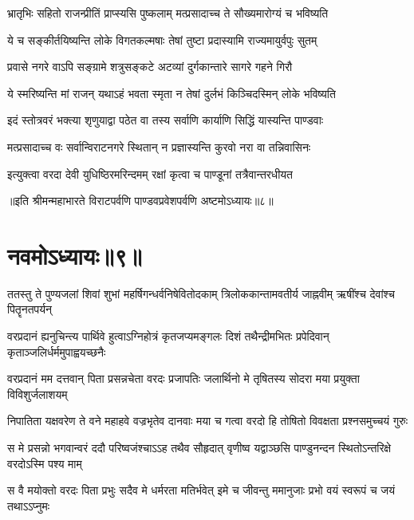 \twolineshloka
{भ्रातृभिः सहितो राजन्प्रीतिं प्राप्स्यसि पुष्कलाम्}
{मत्प्रसादाच्च ते सौख्यमारोग्यं च भविष्यति}


\twolineshloka
{ये च सङ्कीर्तयिष्यन्ति लोके विगतकल्मषाः}
{तेषां तुष्टा प्रदास्यामि राज्यमायुर्वपुः सुतम्}


\twolineshloka
{प्रवासे नगरे वाऽपि सङ्ग्रामे शत्रुसङ्कटे}
{अटव्यां दुर्गकान्तारे सागरे गहने गिरौ}


\twolineshloka
{ये स्मरिष्यन्ति मां राजन् यथाऽहं भवता स्मृता}
{न तेषां दुर्लभं किञ्चिदस्मिन् लोके भविष्यति}


\twolineshloka
{इदं स्तोत्रवरं भक्त्या शृणुयाद्वा पठेत वा}
{तस्य सर्वाणि कार्याणि सिद्धिं यास्यन्ति पाण्डवाः}


\twolineshloka
{मत्प्रसादाच्च वः सर्वान्विराटनगरे स्थितान्}
{न प्रज्ञास्यन्ति कुरवो नरा वा तन्निवासिनः}


\twolineshloka
{इत्युक्त्वा वरदा देवी युधिष्ठिरमरिन्दमम्}
{रक्षां कृत्वा च पाण्डूनां तत्रैवान्तरधीयत}



॥इति श्रीमन्महाभारते विराटपर्वणि पाण्डवप्रवेशपर्वणि अष्टमोऽध्यायः॥८॥

\chapter{नवमोऽध्यायः॥९॥}

\fourlineindentedshloka
{ततस्तु ते पुण्यजलां शिवां शुभां}
{महर्षिगन्धर्वनिषेवितोदकाम्}
{त्रिलोककान्तामवतीर्य जाह्नवीम्}
{ऋषींश्च देवांश्च पितॄनतपर्यन्}


\fourlineindentedshloka
{वरप्रदानं ह्यनुचिन्त्य पार्थिवे}
{हुत्वाऽग्निहोत्रं कृतजप्यमङ्गलः}
{दिशं तथैन्द्रीमभितः प्रपेदिवान्}
{कृताञ्जलिर्धर्ममुपाह्वयच्छनैः}




\fourlineindentedshloka
{वरप्रदानं मम दत्तवान् पिता}
{प्रसन्नचेता वरदः प्रजापतिः}
{जलार्थिनो मे तृषितस्य सोदरा}
{मया प्रयुक्ता विविशुर्जलाशयम्}


\fourlineindentedshloka
{निपातिता यक्षवरेण ते वने}
{महाहवे वज्रभृतेव दानवाः}
{मया च गत्वा वरदो हि तोषितो}
{विवक्षता प्रश्नसमुच्चयं गुरुः}


\fourlineindentedshloka
{स मे प्रसन्नो भगवान्वरं ददौ}
{परिष्वजंश्चाऽऽह तथैव सौहृदात्}
{वृणीष्व यद्वाञ्छसि पाण्डुनन्दन}
{स्थितोऽन्तरिक्षे वरदोऽस्मि पश्य माम्}


\fourlineindentedshloka
{स वै मयोक्तो वरदः पिता प्रभुः}
{सदैव मे धर्मरता मतिर्भवेत्}
{इमे च जीवन्तु ममानुजाः प्रभो}
{वयं स्वरूपं च जयं तथाऽऽप्नुमः}


